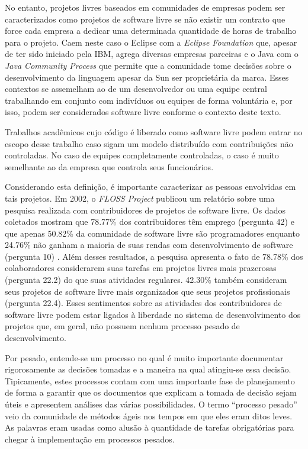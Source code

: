 No entanto, projetos livres baseados em comunidades de empresas podem
ser caracterizados como projetos de software livre se não existir um
contrato que force cada empresa a dedicar uma determinada quantidade
de horas de trabalho para o projeto. Caem neste caso o Eclipse com a
\emph{Eclipse Foundation} que, apesar de ter sido iniciado pela IBM,
agrega diversas empresas parceiras e o Java com o \emph{Java Community
  Process} que permite que a comunidade tome decisões sobre o
desenvolvimento da linguagem apesar da Sun ser proprietária da
marca. Esses contextos se assemelham ao de um desenvolvedor ou uma
equipe central trabalhando em conjunto com indivíduos ou equipes de
forma voluntária e, por isso, podem ser considerados software livre
conforme o contexto deste texto.

Trabalhos acadêmicos cujo código é liberado como software livre podem
entrar no escopo desse trabalho caso sigam um modelo distribuído com
contribuições não controladas. No caso de equipes completamente
controladas, o caso é muito semelhante ao da empresa que controla seus
funcionários.

Considerando esta definição, é importante caracterizar as pessoas
envolvidas em tais projetos. Em 2002, o \emph{FLOSS Project}
\cite{FlossProject} publicou um relatório sobre uma pesquisa realizada
com contribuidores de projetos de software livre. Os dados coletados
mostram que 78.77\% dos contribuidores têm emprego (pergunta 42) e que
apenas 50.82\% da comunidade de software livre são programadores
enquanto 24.76\% não ganham a maioria de suas rendas com
desenvolvimento de software (pergunta 10) \cite{FlossStats}. Além
desses resultados, a pesquisa apresenta o fato de 78.78\% dos
colaboradores considerarem suas tarefas em projetos livres mais
prazerosas (pergunta 22.2) do que suas atividades regulares. 42.30\%
também consideram seus projetos de software livre mais organizados que
seus projetos profissionais (pergunta 22.4).  Esses sentimentos sobre
as atividades dos contribuidores de software livre podem estar ligados
à liberdade no sistema de desenvolvimento dos projetos que, em geral,
não possuem nenhum processo pesado de desenvolvimento.

Por pesado, entende-se um processo no qual é muito importante
documentar rigorosamente as decisões tomadas e a maneira na qual
atingiu-se essa decisão. Tipicamente, estes processos contam com uma
importante fase de planejamento de forma a garantir que os documentos
que explicam a tomada de decisão sejam úteis e apresentem análises das
várias possibilidades. O termo ``processo pesado'' veio da comunidade
de métodos ágeis nos tempos em que eles eram ditos leves. As palavras
eram usadas como alusão à quantidade de tarefas obrigatórias para
chegar à implementação em processos pesados.

